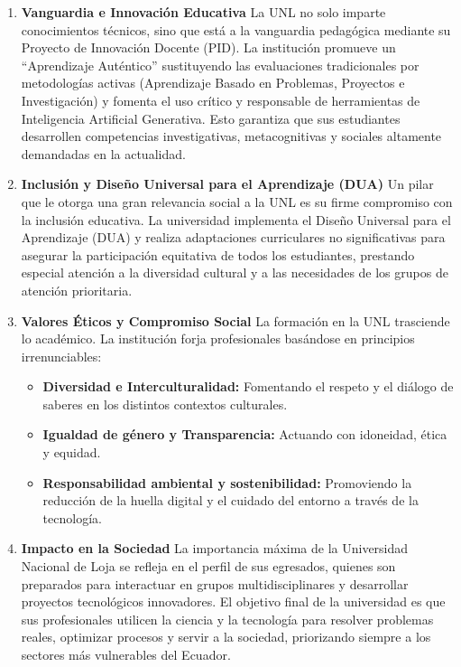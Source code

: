 \documentclass[
  spanish,
  letterpaper,
  DIV=11,
  numbers=noendperiod]{scrreprt}
\providecommand{\tightlist}{%
  \setlength{\itemsep}{0pt}\setlength{\parskip}{0pt}}
\begin{document}
\begin{enumerate}
\def\labelenumi{\arabic{enumi}.}
\item
  \textbf{Vanguardia e Innovación Educativa} La UNL no solo imparte
  conocimientos técnicos, sino que está a la vanguardia pedagógica
  mediante su Proyecto de Innovación Docente (PID). La institución
  promueve un ``Aprendizaje Auténtico'' sustituyendo las evaluaciones
  tradicionales por metodologías activas (Aprendizaje Basado en
  Problemas, Proyectos e Investigación) y fomenta el uso crítico y
  responsable de herramientas de Inteligencia Artificial Generativa.
  Esto garantiza que sus estudiantes desarrollen competencias
  investigativas, metacognitivas y sociales altamente demandadas en la
  actualidad.
\item
  \textbf{Inclusión y Diseño Universal para el Aprendizaje (DUA)} Un
  pilar que le otorga una gran relevancia social a la UNL es su firme
  compromiso con la inclusión educativa. La universidad implementa el
  Diseño Universal para el Aprendizaje (DUA) y realiza adaptaciones
  curriculares no significativas para asegurar la participación
  equitativa de todos los estudiantes, prestando especial atención a la
  diversidad cultural y a las necesidades de los grupos de atención
  prioritaria.
\item
  \textbf{Valores Éticos y Compromiso Social} La formación en la UNL
  trasciende lo académico. La institución forja profesionales basándose
  en principios irrenunciables:

  \begin{itemize}
  \tightlist
  \item
    \textbf{Diversidad e Interculturalidad:} Fomentando el respeto y el
    diálogo de saberes en los distintos contextos culturales.
  \item
    \textbf{Igualdad de género y Transparencia:} Actuando con idoneidad,
    ética y equidad.
  \item
    \textbf{Responsabilidad ambiental y sostenibilidad:} Promoviendo la
    reducción de la huella digital y el cuidado del entorno a través de
    la tecnología.
  \end{itemize}
\item
  \textbf{Impacto en la Sociedad} La importancia máxima de la
  Universidad Nacional de Loja se refleja en el perfil de sus egresados,
  quienes son preparados para interactuar en grupos multidisciplinares y
  desarrollar proyectos tecnológicos innovadores. El objetivo final de
  la universidad es que sus profesionales utilicen la ciencia y la
  tecnología para resolver problemas reales, optimizar procesos y servir
  a la sociedad, priorizando siempre a los sectores más vulnerables del
  Ecuador.
\end{enumerate}
\end{document}
